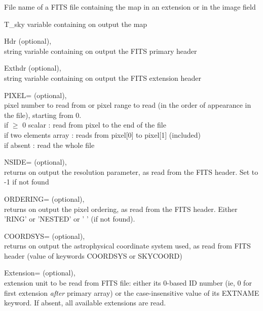 \begin{qualifiers}
  \begin{qulist}{} %
 	\item[{File}] 
          name of a FITS file containing 
               the \healpix map in an extension or in the image field 

 	\item[{T\_sky}] 
	variable containing on output the \healpix map

       \item[{Hdr}]
		  (optional), \\
		string variable containing on output
		  the FITS primary header

       \item[{Exthdr}]
		  (optional), \\
		string variable containing on output
		  the FITS extension header

  	\item[{PIXEL=}] 
		(optional), \\
               pixel number to read from or pixel range to read
                 (in the order of appearance in the file), starting from 0. \\
               if $\ge$ 0 scalar        : read from pixel to the end of the file \\
               if two elements array : reads from pixel[0] to pixel[1]
		(included) \\
               if absent             : read the whole file

	 \item[{NSIDE=}]
		(optional), \\
	        returns on output the \healpix resolution parameter, as read
		from the FITS header. Set to -1 if not found

	 \item[{ORDERING=}]
	        (optional), \\
	        returns on output the pixel ordering, as read from the FITS
	        header. Either 'RING' or 'NESTED' or ' ' (if not found).

	 \item[{COORDSYS=}]
	        (optional), \\
	        returns on output the astrophysical coordinate system used, 
		as read from FITS header (value of keywords COORDSYS or SKYCOORD)

       \item[{Extension=}]
		(optional), \\
	extension unit to be read from FITS file: 
 either its 0-based ID number (ie, 0 for first extension {\em after} primary array) 
 or the case-insensitive value of its EXTNAME keyword.
	If absent, all available extensions are read.
 

  \end{qulist}
\end{qualifiers}


